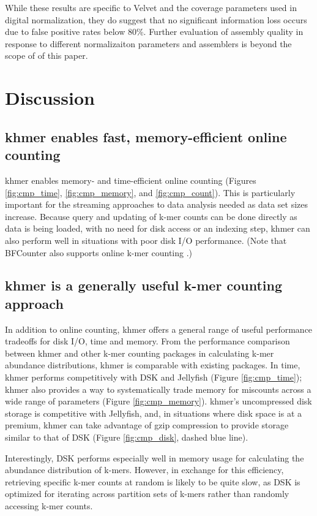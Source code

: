 \documentclass[10pt]{article}
\begin{document}

While these results are specific to Velvet and the coverage parameters
used in digital normalization, they do suggest that no significant
information loss occurs due to false positive rates below 80\%.
Further evaluation of assembly quality in response to different
normalizaiton parameters and assemblers is beyond the scope of of this
paper.

\section*{Discussion}


\subsection*{khmer enables fast, memory-efficient online counting}

khmer enables memory- and time-efficient online counting (Figures
\ref{fig:cmp_time}, \ref{fig:cmp_memory}, and \ref{fig:cmp_count}).
This is particularly important for the streaming approaches to data
analysis needed as data set sizes increase.  Because query and
updating of k-mer counts can be done directly as data is being loaded,
with no need for disk access or an indexing step, khmer can also
perform well in situations with poor disk I/O performance.  (Note that
BFCounter also supports online k-mer counting \cite{Melsted2011}.)

\subsection*{khmer is a generally useful k-mer counting approach}

In addition to online counting, khmer offers a general range of useful
performance tradeoffs for disk I/O, time and memory.  From the
performance comparison between khmer and other k-mer counting packages
in calculating k-mer abundance distributions, khmer is comparable with
existing packages.  In time, khmer performs competitively with DSK and
Jellyfish (Figure \ref{fig:cmp_time}); khmer also provides a way to
systematically trade memory for miscounts across a wide range of
parameters (Figure \ref{fig:cmp_memory}).  khmer's uncompressed disk
storage is competitive with Jellyfish, and, in situations where disk
space is at a premium, khmer can take advantage of gzip compression to
provide storage similar to that of DSK (Figure \ref{fig:cmp_disk},
dashed blue line).

Interestingly, DSK performs especially well in memory usage for
calculating the abundance distribution of k-mers. However, in exchange
for this efficiency, retrieving specific k-mer counts at random is
likely to be quite slow, as DSK is optimized for iterating across
partition sets of k-mers rather than randomly accessing k-mer counts.
\end{document}
